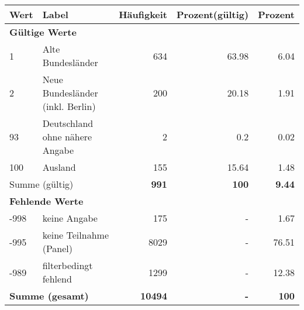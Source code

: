      \begin{longtable}{lXrrr}
     \toprule
     \textbf{Wert} & \textbf{Label} & \textbf{Häufigkeit} & \textbf{Prozent(gültig)} & \textbf{Prozent} \\
     \endhead
     \midrule
     \multicolumn{5}{l}{\textbf{Gültige Werte}}\\

     1 &
     \multicolumn{1}{X}{ Alte Bundesländer   } &


       \num{634} &
       \num[round-mode=places,round-precision=2]{63.98} &
         \num[round-mode=places,round-precision=2]{6.04} \\

     2 &
     \multicolumn{1}{X}{ Neue Bundesländer (inkl. Berlin)   } &


       \num{200} &
       \num[round-mode=places,round-precision=2]{20.18} &
         \num[round-mode=places,round-precision=2]{1.91} \\

     93 &
     \multicolumn{1}{X}{ Deutschland ohne nähere Angabe   } &


       \num{2} &
       \num[round-mode=places,round-precision=2]{0.2} &
         \num[round-mode=places,round-precision=2]{0.02} \\

     100 &
     \multicolumn{1}{X}{ Ausland   } &


       \num{155} &
       \num[round-mode=places,round-precision=2]{15.64} &
         \num[round-mode=places,round-precision=2]{1.48} \\
     \midrule
     \multicolumn{2}{l}{Summe (gültig)} &
       \textbf{\num{991}} &
     \textbf{\num{100}} &
       \textbf{\num[round-mode=places,round-precision=2]{9.44}} \\
     \multicolumn{5}{l}{\textbf{Fehlende Werte}}\\
       -998 &
       keine Angabe &
         \num{175} &
        - &
         \num[round-mode=places,round-precision=2]{1.67} \\
       -995 &
       keine Teilnahme (Panel) &
         \num{8029} &
        - &
         \num[round-mode=places,round-precision=2]{76.51} \\
       -989 &
       filterbedingt fehlend &
         \num{1299} &
        - &
         \num[round-mode=places,round-precision=2]{12.38} \\
     \midrule
     \multicolumn{2}{l}{\textbf{Summe (gesamt)}} &
          \textbf{\num{10494}} &
        \textbf{-} &
        \textbf{\num{100}} \\
     \bottomrule
     \end{longtable}
     
